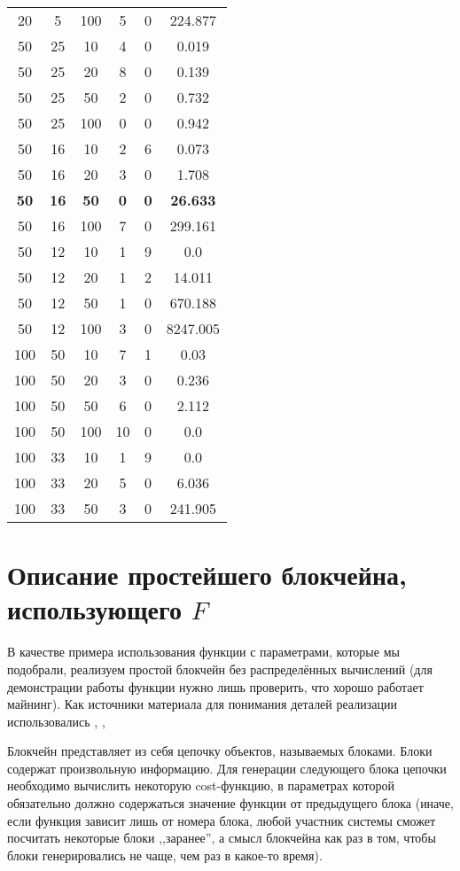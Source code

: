 \documentclass{article}
\begin{document}
\begin{table}
\begin{center}
\begin{tabular}{cccccc}
20 & 5 & 100 & 5 & 0 & 224.877\\
50 & 25 & 10 & 4 & 0 & 0.019\\
50 & 25 & 20 & 8 & 0 & 0.139\\
50 & 25 & 50 & 2 & 0 & 0.732\\
50 & 25 & 100 & 0 & 0 & 0.942\\
50 & 16 & 10 & 2 & 6 & 0.073\\
50 & 16 & 20 & 3 & 0 & 1.708\\
\textbf{50} & \textbf{16} & \textbf{50} & \textbf{0} & \textbf{0} & \textbf{26.633}\\
50 & 16 & 100 & 7 & 0 & 299.161\\
50 & 12 & 10 & 1 & 9 & 0.0\\
50 & 12 & 20 & 1 & 2 & 14.011\\
50 & 12 & 50 & 1 & 0 & 670.188\\
50 & 12 & 100 & 3 & 0 & 8247.005\\
100 & 50 & 10 & 7 & 1 & 0.03\\
100 & 50 & 20 & 3 & 0 & 0.236\\
100 & 50 & 50 & 6 & 0 & 2.112\\
100 & 50 & 100 & 10 & 0 & 0.0\\
100 & 33 & 10 & 1 & 9 & 0.0\\
100 & 33 & 20 & 5 & 0 & 6.036\\
100 & 33 & 50 & 3 & 0 & 241.905\\
\end{tabular}
\end{center}
\end{table}

\section{Описание простейшего блокчейна, использующего $F$}


    В качестве примера использования функции с параметрами, которые мы подобрали, реализуем простой блокчейн без распределённых вычислений (для демонстрации работы функции нужно лишь проверить, что хорошо работает майнинг). Как источники материала для понимания деталей реализации использовались \cite{coursera}, \cite{bitcoin}, \cite{guide}

    Блокчейн представляет из себя цепочку объектов, называемых блоками. Блоки содержат произвольную информацию. Для генерации следующего блока цепочки необходимо вычислить некоторую cost-функцию, в параметрах которой обязательно должно содержаться значение функции от предыдущего блока (иначе, если функция зависит лишь от номера блока, любой участник системы сможет посчитать некоторые блоки ,,заранее'', а смысл блокчейна как раз в том, чтобы блоки генерировались не чаще, чем раз в какое-то время).
\end{document}
